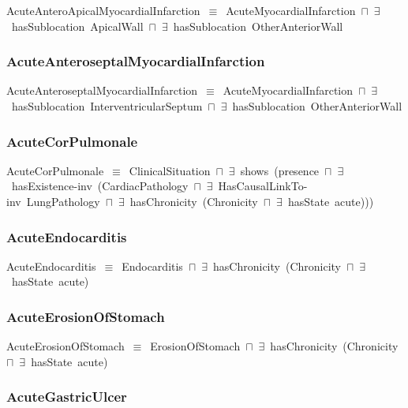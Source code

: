 \documentclass{article}
\begin{document}
AcuteAnteroApicalMyocardialInfarction~\ensuremath{\equiv}~AcuteMyocardialInfarction~\ensuremath{\sqcap}~\ensuremath{\exists}~hasSublocation~ApicalWall~\ensuremath{\sqcap}~\ensuremath{\exists}~hasSublocation~OtherAnteriorWall

\subsubsection*{AcuteAnteroseptalMyocardialInfarction}

AcuteAnteroseptalMyocardialInfarction~\ensuremath{\equiv}~AcuteMyocardialInfarction~\ensuremath{\sqcap}~\ensuremath{\exists}~hasSublocation~InterventricularSeptum~\ensuremath{\sqcap}~\ensuremath{\exists}~hasSublocation~OtherAnteriorWall

\subsubsection*{AcuteCorPulmonale}

AcuteCorPulmonale~\ensuremath{\equiv}~ClinicalSituation~\ensuremath{\sqcap}~\ensuremath{\exists}~shows~(presence~\ensuremath{\sqcap}~\ensuremath{\exists}~hasExistence-inv~(CardiacPathology~\ensuremath{\sqcap}~\ensuremath{\exists}~HasCausalLinkTo-inv~LungPathology~\ensuremath{\sqcap}~\ensuremath{\exists}~hasChronicity~(Chronicity~\ensuremath{\sqcap}~\ensuremath{\exists}~hasState~acute)))

\subsubsection*{AcuteEndocarditis}

AcuteEndocarditis~\ensuremath{\equiv}~Endocarditis~\ensuremath{\sqcap}~\ensuremath{\exists}~hasChronicity~(Chronicity~\ensuremath{\sqcap}~\ensuremath{\exists}~hasState~acute)

\subsubsection*{AcuteErosionOfStomach}

AcuteErosionOfStomach~\ensuremath{\equiv}~ErosionOfStomach~\ensuremath{\sqcap}~\ensuremath{\exists}~hasChronicity~(Chronicity~\ensuremath{\sqcap}~\ensuremath{\exists}~hasState~acute)

\subsubsection*{AcuteGastricUlcer}
\end{document}
